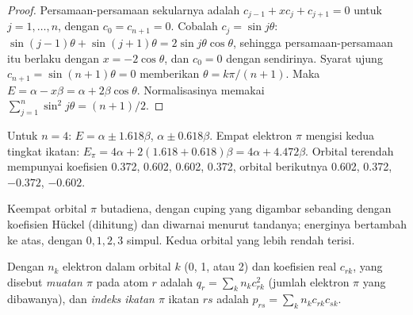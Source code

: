 \begin{proof}
Persamaan-persamaan sekularnya adalah $c_{j-1} + xc_j + c_{j+1} = 0$ untuk
$j = 1, \dots, n$, dengan $c_0 = c_{n+1} = 0$. Cobalah $c_j = \sin j\theta$:
$\sin(j - 1)\theta + \sin(j + 1)\theta = 2\sin
j\theta\cos\theta$, sehingga persamaan-persamaan itu berlaku dengan
$x = -2\cos\theta$, dan $c_0 = 0$ dengan sendirinya. Syarat ujung
$c_{n+1} = \sin(n + 1)\theta = 0$ memberikan $\theta =
k\pi/(n + 1)$. Maka
$E = \alpha - x\beta = \alpha + 2\beta\cos\theta$. Normalisasinya memakai
$\sum_{j=1}^n\sin^2 j\theta = (n + 1)/2$.
\end{proof}

\begin{example}[Butadiena]\label{ex:b2:huckel:butadiene}
Untuk $n = 4$: $E = \alpha \pm 1.618\beta$, $\alpha \pm 0.618\beta$. Empat
elektron $\pi$ mengisi kedua tingkat ikatan:
$E_\pi = 4\alpha + 2(1.618 + 0.618)\beta = 4\alpha + 4.472\beta$. Orbital
terendah mempunyai koefisien 0.372, 0.602, 0.602, 0.372, orbital
berikutnya 0.602, 0.372, $-0.372$, $-0.602$.
\end{example}

\begin{omfigure}

{\small Keempat orbital $\pi$ butadiena, dengan cuping yang digambar
sebanding dengan koefisien Hückel (dihitung) dan diwarnai menurut
tandanya; energinya bertambah ke atas, dengan $0, 1, 2, 3$ simpul. Kedua
orbital yang lebih rendah terisi.}
\end{omfigure}

\begin{definition}\label{def:b2:huckel:indices}
Dengan $n_k$ elektron dalam orbital $k$ (0, 1, atau 2) dan koefisien real
$c_{rk}$, yang disebut \emph{muatan $\pi$} pada
atom $r$ adalah $q_r = \sum_k n_kc_{rk}^2$ (jumlah elektron $\pi$ yang
dibawanya), dan \emph{indeks ikatan $\pi$}
ikatan $rs$ adalah $p_{rs} = \sum_k n_kc_{rk}c_{sk}$.
\end{definition}

